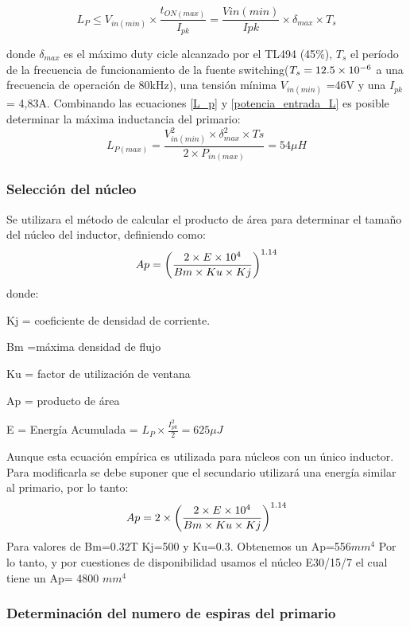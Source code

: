 \begin{equation}
L_P \leq V_{in(min)} \times \frac{t_{ON(max)}}{I_{pk}}= \frac{V{in(min)}}{Ipk} \times \delta_{max} \times T_s \label{L_p}   
\end{equation}

donde  $\delta_{max}$ es el máximo duty cicle alcanzado por el TL494 (45$\%$), $T_s$ el período de la frecuencia de funcionamiento de la fuente switching($T_s =12.5\times 10^{-6}$ a una frecuencia de operación de 80kHz), una tensión mínima $V_{in(min)}$ =46V y una $I_{pk}$= 4,83A.
Combinando las ecuaciones \ref{L_p} y \ref{potencia_entrada_L} es posible determinar la máxima inductancia del primario:
$$
L_{P(max)} = \frac{V_{in(min)}^2 \times \delta_{max}^2 \times Ts}{2 \times P_{in(max)}} = 54\mu H
$$


\subsubsection{Selección del núcleo}


Se utilizara el método de calcular el producto de área para determinar el tamaño del núcleo del inductor, definiendo como:
$$
Ap= {\left( \frac{  2 \times E \times 10^{4}}{Bm \times Ku \times Kj} \right) } ^{ 1.14}
$$
donde:
\begin{list}{ }
 \item Kj = coeficiente de densidad de corriente.
\item Bm =máxima densidad  de flujo 
\item Ku = factor de utilización de ventana 
\item Ap = producto de área 
\item E = Energía Acumulada = $ L_P \times \frac{I_{pk}^2 }{2} = 625 \mu J $ 
\item
\end{list}

Aunque esta ecuación empírica es utilizada para núcleos con un único inductor. Para modificarla se debe suponer que el secundario utilizará una energía similar al primario, por lo tanto:
$$
A p= 2 \times {\left( \frac{  2 \times E \ensuremath{\times 10^{4}}}{Bm \times Ku \times Kj} \right) } ^{ 1.14}
$$
Para valores de Bm=0.32T  Kj=500 y Ku=0.3. Obtenemos un Ap=556$mm^4$
Por lo tanto, y por cuestiones de disponibilidad usamos el núcleo E30/15/7 el cual tiene un Ap= 4800 $mm^4$

\subsubsection{Determinación del numero de espiras del primario}

